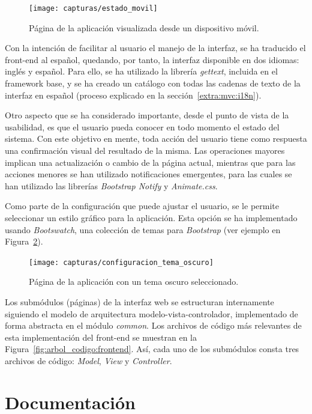 \begin{figure}[!htp]
  \centering
  \texttt{[image: capturas/estado\_movil]}
  \caption{Página de la aplicación visualizada desde un dispositivo móvil.}
  \label{fig:captura:movil}
\end{figure}

Con la intención de facilitar al usuario el manejo de la interfaz, se ha traducido el \gls{front-end} al español, quedando, por tanto, la interfaz disponible en dos idiomas: inglés y español.
Para ello, se ha utilizado la librería \textit{gettext}, incluida en el \gls{framework} base, y se ha creado un catálogo con todas las cadenas de texto de la interfaz en español (proceso explicado en la sección~\ref{extra:mvc:i18n}).

Otro aspecto que se ha considerado importante, desde el punto de vista de la usabilidad, es que el usuario pueda conocer en todo momento el estado del sistema.
Con este objetivo en mente, toda acción del usuario tiene como respuesta una confirmación visual del resultado de la misma.
Las operaciones mayores implican una actualización o cambio de la página actual, mientras que para las acciones menores se han utilizado notificaciones emergentes, para las cuales se han utilizado las librerías \textit{Bootstrap Notify} y \textit{Animate.css}.

Como parte de la configuración que puede ajustar el usuario, se le permite seleccionar un estilo gráfico para la aplicación.
Esta opción se ha implementado usando \textit{Bootswatch}, una colección de temas para \textit{Bootstrap} (ver ejemplo en Figura~\ref{fig:captura:oscuro}).

\begin{figure}[!htp]
  \centering
  \texttt{[image: capturas/configuracion\_tema\_oscuro]}
  \caption{Página de la aplicación con un tema oscuro seleccionado.}
  \label{fig:captura:oscuro}
\end{figure}

Los submódulos (páginas) de la interfaz web se estructuran internamente siguiendo el modelo de arquitectura modelo-vista-controlador, implementado de forma abstracta en el módulo \textit{common}.
Los archivos de código más relevantes de esta implementación del \gls{front-end} se muestran en la Figura~\ref{fig:arbol_codigo:frontend}.
Así, cada uno de los submódulos consta tres archivos de código: \textit{Model}, \textit{View} y \textit{Controller}.

\section{Documentación\label{sec:imp:docs}}

